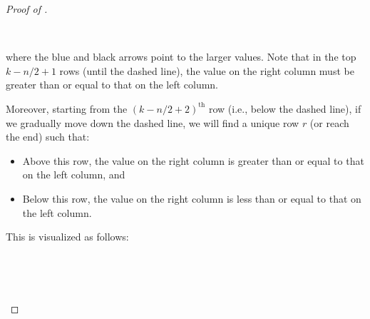 \begin{proof}[Proof of ]
\begin{center}
\begin{tikzpicture}[every text node part/.style={align=center}]
\end{tikzpicture}
    
\end{center}
$ $

\noindent %
where 
the blue and black arrows point to the larger values. 
Note that in the top $k-n/2 + 1$ rows (until the dashed line), the value on the right column must be greater than or equal to that on the left column.

Moreover, starting from the $(k-n/2 +2 )^\text{th}$ row (i.e., below
the dashed line), if we gradually move down the dashed line, we will find a unique row $r$ (or reach the end) such that: \begin{itemize}
    \item Above this row, the value on the right column is greater than or equal to that on the left column, and \item Below this row, the value on the right column is less than or equal to that on the left column.
\end{itemize}
This is visualized as follows:

$ $

  \begin{center}
  
$ $

\end{center}
\end{proof}
